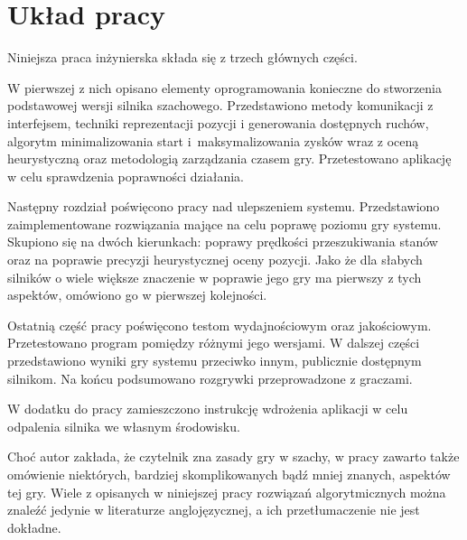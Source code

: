\usepackage{biblatex}\section{Układ pracy}
\label{sec:uklad-pracy}

Niniejsza praca inżynierska składa się z trzech głównych części.

W pierwszej z nich opisano elementy oprogramowania konieczne do stworzenia podstawowej wersji silnika szachowego.
Przedstawiono metody komunikacji z interfejsem, techniki reprezentacji pozycji i generowania dostępnych ruchów, algorytm minimalizowania start i~maksymalizowania zysków wraz z oceną heurystyczną oraz metodologią zarządzania czasem gry.
Przetestowano aplikację w celu sprawdzenia poprawności działania.

Następny rozdział poświęcono pracy nad ulepszeniem systemu.
Przedstawiono zaimplementowane rozwiązania mające na celu poprawę poziomu gry systemu.
Skupiono się na dwóch kierunkach: poprawy prędkości przeszukiwania stanów oraz na poprawie precyzji heurystycznej oceny pozycji.
Jako że dla słabych silników o wiele większe znaczenie w poprawie jego gry ma pierwszy z tych aspektów, omówiono go w pierwszej kolejności. \cite*{Vrzina2023}

Ostatnią część pracy poświęcono testom wydajnościowym oraz jakościowym.
Przetestowano program pomiędzy różnymi jego wersjami.
W dalszej części przedstawiono wyniki gry systemu przeciwko innym, publicznie dostępnym silnikom.
Na końcu podsumowano rozgrywki przeprowadzone z graczami.

W dodatku do pracy zamieszczono instrukcję wdrożenia aplikacji w celu odpalenia silnika we własnym środowisku.

Choć autor zakłada, że czytelnik zna zasady gry w szachy, w pracy zawarto także omówienie niektórych, bardziej skomplikowanych bądź mniej znanych, aspektów tej gry.
Wiele z opisanych w niniejszej pracy rozwiązań algorytmicznych można znaleźć jedynie w literaturze anglojęzycznej, a ich przetłumaczenie nie jest dokładne.